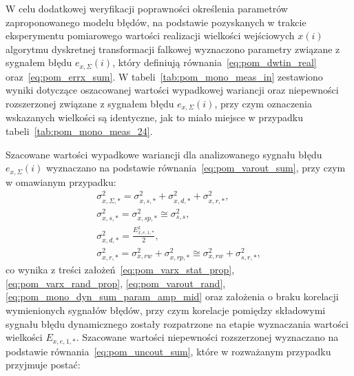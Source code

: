W celu dodatkowej weryfikacji poprawności określenia parametrów zaproponowanego modelu błędów, na podstawie pozyskanych w trakcie eksperymentu pomiarowego wartości realizacji wielkości wejściowych $x(i)$ algorytmu dyskretnej transformacji falkowej wyznaczono parametry związane z sygnałem błędu $e_{x,\Sigma}(i)$, który definiują równania~\eqref{eq:pom_dwtin_real} oraz~\eqref{eq:pom_errx_sum}. W tabeli~\ref{tab:pom_mono_meas_in} zestawiono wyniki dotyczące oszacowanej wartości wypadkowej wariancji oraz niepewności rozszerzonej związane z sygnałem błędu $e_{x,\Sigma}(i)$, przy czym oznaczenia wskazanych wielkości są identyczne, jak to miało miejsce w przypadku tabeli~\ref{tab:pom_mono_meas_24}.

Szacowane wartości wypadkowe wariancji dla analizowanego sygnału błędu $e_{x,\Sigma}(i)$ wyznaczano na podstawie równania~\eqref{eq:pom_varout_sum}, przy czym w omawianym przypadku:
\begin{gather}
\sigma_{x,\Sigma,*}^{2} = \sigma_{x,s,*}^{2} + \sigma_{x,d,*}^{2} + \sigma_{x,r,*}^{2} \label{eq:pom_varx_sum_all}, \\
\sigma_{x,s,*}^{2} = \sigma_{x,sp,*}^{2} \cong \sigma_{s,s}^{2} \label{eq:pom_varx_sum_stat}, \\
\sigma_{x,d,*}^{2} = \frac{E_{x,e,1,*}^{2}}{2} \label{eq:pom_varx_sum_dyn}, \\
\sigma_{x,r,*}^{2} = \sigma_{x,rw}^{2} + \sigma_{x,rp,*}^{2} \cong \sigma_{x,rw}^{2} + \sigma_{s,r,*}^{2} \label{eq:pom_varx_sum_rand},
\end{gather}
co wynika z treści założeń~\eqref{eq:pom_varx_stat_prop}, \eqref{eq:pom_varx_rand_prop}, \eqref{eq:pom_varout_rand}, \eqref{eq:pom_mono_dyn_sum_param_amp_mid} oraz założenia o braku korelacji wymienionych sygnałów błędów, przy czym korelacje pomiędzy składowymi sygnału błędu dynamicznego zostały rozpatrzone na etapie wyznaczania wartości wielkości $E_{x,e,1,*}$. Szacowane wartości niepewności rozszerzonej wyznaczano na podstawie równania~\eqref{eq:pom_uncout_sum}, które w rozważanym przypadku przyjmuje postać:
